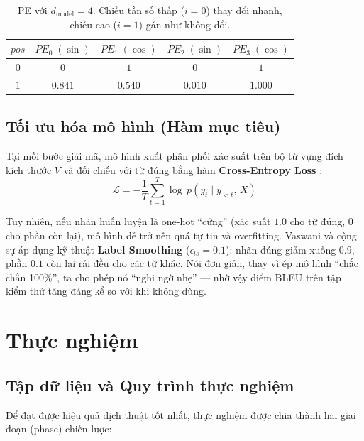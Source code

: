 \documentclass[a4paper,12pt,twoside]{report}
\begin{document}
\begin{table}[H]
    \centering
    \renewcommand{\arraystretch}{1.3}
    \begin{tabular}{|c|c|c|c|c|}
        \hline
        $pos$ & $PE_0\;(\sin)$ & $PE_1\;(\cos)$ & $PE_2\;(\sin)$ & $PE_3\;(\cos)$ \\
        \hline
        $0$ & $0$ & $1$ & $0$ & $1$ \\
        \hline
        $1$ & $0.841$ & $0.540$ & $0.010$ & $1.000$ \\
        \hline
    \end{tabular}
    \caption{PE với $d_{\text{model}} = 4$. Chiều tần số thấp ($i\!=\!0$) thay đổi nhanh, chiều cao ($i\!=\!1$) gần như không đổi.}
    \label{tab:pe_example}
\end{table}

\section{Tối ưu hóa mô hình (Hàm mục tiêu)}
Tại mỗi bước giải mã, mô hình xuất phân phối xác suất trên bộ từ vựng đích kích thước $V$ và đối chiếu với từ đúng bằng hàm \textbf{Cross-Entropy Loss} \cite{nlp_ebook}:
\begin{equation}
    \mathcal{L} = -\frac{1}{T}\sum_{t=1}^{T} \log\, p(y_t \mid y_{<t},\, X)
\end{equation}

Tuy nhiên, nếu nhãn huấn luyện là one-hot ``cứng'' (xác suất $1.0$ cho từ đúng, $0$ cho phần còn lại), mô hình dễ trở nên quá tự tin và overfitting. Vaswani và cộng sự \cite{vaswani2017attention} áp dụng kỹ thuật \textbf{Label Smoothing} ($\epsilon_{ls} = 0.1$): nhãn đúng giảm xuống $0.9$, phần $0.1$ còn lại rải đều cho các từ khác. Nói đơn giản, thay vì ép mô hình ``chắc chắn 100\%'', ta cho phép nó ``nghi ngờ nhẹ'' --- nhờ vậy điểm BLEU trên tập kiểm thử tăng đáng kể so với khi không dùng.

\chapter{Thực nghiệm}

\section{Tập dữ liệu và Quy trình thực nghiệm}
Để đạt được hiệu quả dịch thuật tốt nhất, thực nghiệm được chia thành hai giai đoạn (phase) chiến lược:
\end{document}

